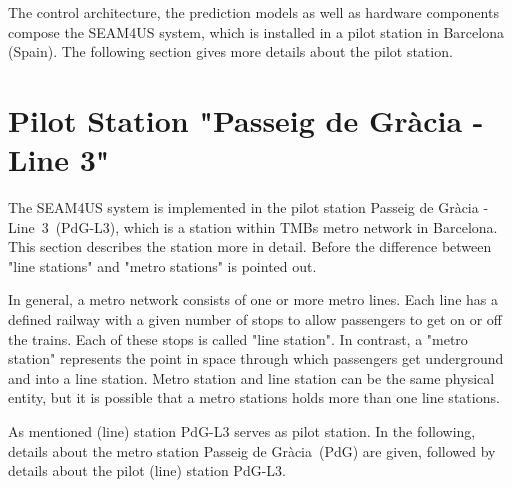 The control architecture, the prediction models as well as hardware components compose the SEAM4US system, which is installed in a pilot station in Barcelona (Spain). The following section gives more details about the pilot station.


\section{Pilot Station "Passeig de Gr\`{a}cia - Line 3"}
\label{sec:station}


The SEAM4US system is implemented in the pilot station Passeig de Gr\`{a}cia - Line~3~(PdG-L3), which is a station within TMBs metro network in Barcelona. This section describes the station more in detail.
Before the difference between "line stations" and "metro stations" is pointed out.

In general, a metro network consists of one or more metro lines. Each line has a defined railway with a given number of stops to allow passengers to get on or off the trains. Each of these stops is called "line station". In contrast, a "metro station" represents the point in space through which passengers get underground and into a line station. Metro station and line station can be the same physical entity, but it is possible that a metro stations holds more than one line stations.

As mentioned (line) station PdG-L3 serves as pilot station. In the following, details about the metro station Passeig de Gr\`{a}cia~(PdG) are given, followed by details about the pilot (line) station PdG-L3.


